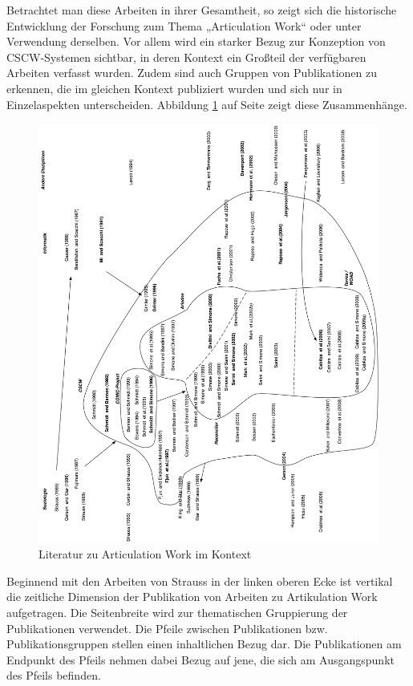 Betrachtet man diese Arbeiten in ihrer Gesamtheit, so zeigt sich die historische Entwicklung der Forschung zum Thema „Articulation Work“ oder unter Verwendung derselben. Vor allem wird ein starker Bezug zur Konzeption von \gls{CSCW}-Systemen sichtbar, in deren Kontext ein Großteil der verfügbaren Arbeiten verfasst wurden. Zudem sind auch Gruppen von Publikationen zu erkennen, die im gleichen Kontext publiziert wurden und sich nur in Einzelaspekten unterscheiden. Abbildung \ref{fig:img_ArticulationWork_ArticulationWorkLiteratur} auf Seite \pageref{fig:img_ArticulationWork_ArticulationWorkLiteratur} zeigt diese Zusammenhänge.

\begin{figure}[htbp]
	\centering
		\includegraphics[width=\textwidth]{img/ArticulationWork/ArticulationWorkLiteratur.png}
	\caption{Literatur zu Articulation Work im Kontext}
	\label{fig:img_ArticulationWork_ArticulationWorkLiteratur}
\end{figure}

Beginnend mit den Arbeiten von Strauss in der linken oberen Ecke ist vertikal die zeitliche Dimension der Publikation von Arbeiten zu Artikulation Work aufgetragen. Die Seitenbreite wird zur thematischen Gruppierung der Publikationen verwendet. Die Pfeile zwischen Publikationen bzw. Publikationsgruppen stellen einen inhaltlichen Bezug dar. Die Publikationen am Endpunkt des Pfeils nehmen dabei Bezug auf jene, die sich am Ausgangspunkt des Pfeils befinden.

